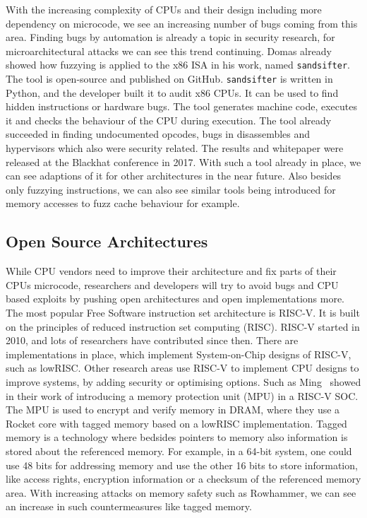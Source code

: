 With the increasing complexity of CPUs and their design including more
dependency on microcode, we see an increasing number of bugs coming from this
area. Finding bugs by automation is already a topic in security research, for
microarchitectural attacks we can see this trend continuing.
Domas\cite{sandsifter} already showed how fuzzying is applied to the x86 ISA in
his work, named \texttt{sandsifter}. The tool is open-source and published on
GitHub\cite{sandsifterurl}. \texttt{sandsifter} is written in Python, and the
developer built it to audit x86 CPUs. It can be used to find hidden instructions
or hardware bugs. The tool generates machine code, executes it and checks the
behaviour of the CPU during execution. The tool already succeeded in finding
undocumented opcodes, bugs in disassembles and hypervisors which also were
security related. The results and whitepaper were released at the Blackhat
conference in 2017\cite{sandsifter}. With such a tool already in place, we can
see adaptions of it for other architectures in the near future. Also besides
only fuzzying instructions, we can also see similar tools being introduced for
memory accesses to fuzz cache behaviour for example.

\subsection{Open Source Architectures}

While CPU vendors need to improve their architecture and fix parts of their
CPU\textquotesingle s microcode, researchers and developers will try to avoid
bugs and CPU based exploits by pushing open architectures and open
implementations more. The most popular Free Software instruction set
architecture is RISC-V. It is built on the principles of reduced instruction
set computing (RISC). RISC-V started in 2010, and lots of researchers have
contributed since then. There are implementations in place, which implement
System-on-Chip designs of RISC-V, such as lowRISC\cite{lowrisc}. Other
research areas use RISC-V  to implement CPU designs to improve systems, by
adding security or optimising options. Such as Ming~\etal\cite{smarts} showed
in their work of introducing a memory protection unit (MPU) in a RISC-V SOC.
The MPU is used to encrypt and verify memory in DRAM, where they use a Rocket
core with tagged memory based on a lowRISC implementation. Tagged memory is a
technology where bedsides pointers to memory also information is stored about
the referenced memory. For example, in a 64-bit system, one could use 48 bits
for addressing memory and use the other 16 bits to store information, like
access rights, encryption information or a checksum of the referenced memory
area. With increasing attacks on memory safety such as Rowhammer, we can see an
increase in such countermeasures like tagged memory.

